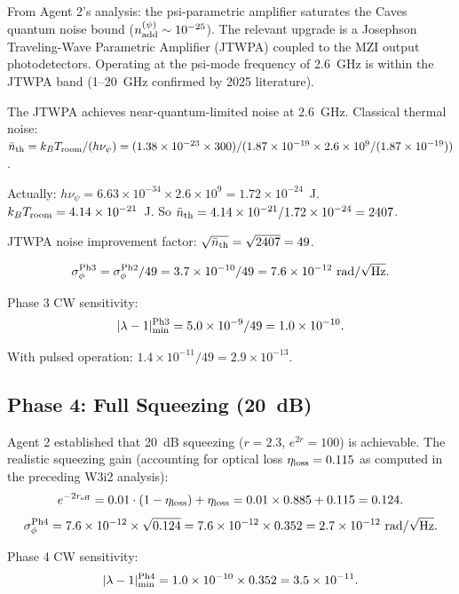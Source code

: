 \documentclass[11pt]{article}
\newcommand{\ee}[1]{\times 10^{#1}}
\begin{document}
From Agent 2's analysis: the psi-parametric amplifier saturates the Caves
quantum noise bound ($n_{\rm add}^{(\psi)} \sim 10^{-25}$). The relevant
upgrade is a Josephson Traveling-Wave Parametric Amplifier (JTWPA) coupled
to the MZI output photodetectors. Operating at the psi-mode frequency
of 2.6~GHz is within the JTWPA band (1--20~GHz confirmed by 2025 literature).

The JTWPA achieves near-quantum-limited noise at 2.6~GHz.
Classical thermal noise: $\bar{n}_{\rm th} = k_BT_{\rm room}/(h\nu_\psi)
= (1.38\ee{-23}\times 300)/(1.87\ee{-19} \times 2.6\ee{9}/(1.87\ee{-19}))$.

Actually: $h\nu_\psi = 6.63\ee{-34} \times 2.6\ee{9} = 1.72\ee{-24}$~J.
$k_BT_{\rm room} = 4.14\ee{-21}$~J. So $\bar{n}_{\rm th} = 4.14\ee{-21}/1.72\ee{-24} = 2407$.

JTWPA noise improvement factor: $\sqrt{\bar{n}_{\rm th}} = \sqrt{2407} = 49$.

\begin{equation}
\sigma_\phi^{\rm Ph3} = \sigma_\phi^{\rm Ph2} / 49 = 3.7\ee{-10}/49 = 7.6\ee{-12}~{\rm rad}/\sqrt{\rm Hz}.
\end{equation}

Phase 3 CW sensitivity:
\begin{equation}
|\lambda-1|_{\rm min}^{\rm Ph3} = 5.0\ee{-9}/49 = 1.0\ee{-10}.
\end{equation}

With pulsed operation: $1.4\ee{-11}/49 = 2.9\ee{-13}$.

\subsection{Phase 4: Full Squeezing (20~dB)}

Agent 2 established that 20~dB squeezing ($r = 2.3$, $e^{2r} = 100$) is
achievable. The realistic squeezing gain (accounting for optical loss
$\eta_{\rm loss} = 0.115$ as computed in the preceding W3i2 analysis):
\begin{equation}
e^{-2r_{\rm eff}} = 0.01 \cdot (1 - \eta_{\rm loss}) + \eta_{\rm loss}
= 0.01 \times 0.885 + 0.115 = 0.124.
\end{equation}
\begin{equation}
\sigma_\phi^{\rm Ph4} = 7.6\ee{-12} \times \sqrt{0.124} = 7.6\ee{-12} \times 0.352
= 2.7\ee{-12}~{\rm rad}/\sqrt{\rm Hz}.
\end{equation}

Phase 4 CW sensitivity:
\begin{equation}
|\lambda-1|_{\rm min}^{\rm Ph4} = 1.0\ee{-10} \times 0.352 = 3.5\ee{-11}.
\end{equation}
\end{document}
